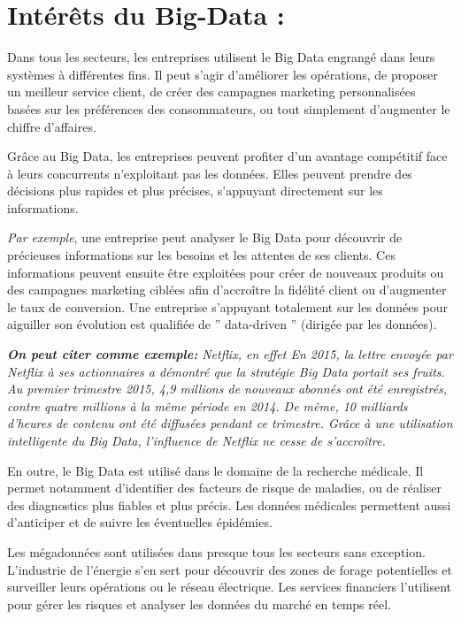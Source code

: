 \section{Intérêts du Big-Data :}
Dans tous les secteurs, les entreprises utilisent le Big Data engrangé dans leurs systèmes à différentes fins. Il peut s'agir d'améliorer les opérations, de proposer un meilleur service client, de créer des campagnes marketing personnalisées basées sur les préférences des consommateurs, ou tout simplement d'augmenter le chiffre d'affaires.

Grâce au Big Data, les entreprises peuvent profiter d'un avantage compétitif face à leurs concurrents n'exploitant pas les données. Elles peuvent prendre des décisions plus rapides et plus précises, s'appuyant directement sur les informations.

\textit{Par exemple}, une entreprise peut analyser le Big Data pour découvrir de précieuses informations sur les besoins et les attentes de ses clients. Ces informations peuvent ensuite être exploitées pour créer de nouveaux produits ou des campagnes marketing ciblées afin d'accroître la fidélité client ou d'augmenter le taux de conversion. Une entreprise s'appuyant totalement sur les données pour aiguiller son évolution est qualifiée de ” data-driven ” (dirigée par les données).

\textit{\textbf{On peut citer comme exemple:} Netflix, en effet En 2015, la lettre envoyée par Netflix à ses actionnaires a démontré que la stratégie Big Data portait ses fruits. Au premier trimestre 2015, 4,9 millions de nouveaux abonnés ont été enregistrés, contre quatre millions à la même période en 2014. De même, 10 milliards d'heures de contenu ont été diffusées pendant ce trimestre. Grâce à une utilisation intelligente du Big Data, l'influence de Netflix ne cesse de s'accroître.}

En outre, le Big Data est utilisé dans le domaine de la recherche médicale. Il permet notamment d'identifier des facteurs de risque de maladies, ou de réaliser des diagnostics plus fiables et plus précis. Les données médicales permettent aussi d'anticiper et de suivre les éventuelles épidémies.

Les mégadonnées sont utilisées dans presque tous les secteurs sans exception. L'industrie de l'énergie s'en sert pour découvrir des zones de forage potentielles et surveiller leurs opérations ou le réseau électrique. Les services financiers l'utilisent pour gérer les risques et analyser les données du marché en temps réel.

